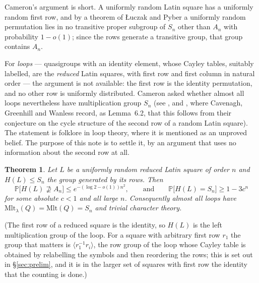\documentclass[11pt]{amsart}
\theoremstyle{plain}
\newtheorem{theorem}{Theorem}
\theoremstyle{remark}
\newcommand{\Mlt}{\mathrm{Mlt}}
\renewcommand{\Pr}{\mathbb{P}}
\begin{document}
Cameron's argument is short.  A uniformly random Latin square has a
uniformly random first row, and by a theorem of {\L}uczak and Pyber
\cite{LP93} a uniformly random permutation lies in no transitive proper
subgroup of $S_n$ other than $A_n$ with probability $1-o(1)$; since the
rows generate a transitive group, that group contains $A_n$.

For \emph{loops} --- quasigroups with an identity element, whose Cayley
tables, suitably labelled, are the \emph{reduced} Latin squares, with
first row and first column in natural order --- the argument is not
available: the first row is the identity permutation, and no other row
is uniformly distributed.  Cameron asked whether almost all loops nevertheless have
multiplication group $S_n$ (see \cite{Cam15}, and \cite[\S6]{CGW08},
where Cavenagh, Greenhill and Wanless record, as Lemma~6.2, that this
follows from their conjecture on the cycle structure of the second row
of a random Latin square).  The statement is folklore in loop theory,
where it is mentioned as an unproved belief.  The purpose of this note
is to settle it, by an argument that uses no information about the
second row at all.

\begin{theorem}\label{thm:main}
Let $L$ be a uniformly random reduced Latin square of order $n$ and
$H(L)\le S_n$ the group generated by its rows.  Then
\[
\Pr\bigl[H(L)\not\supseteq A_n\bigr]\le e^{-(\log2-o(1))n^2},
\qquad\text{and}\qquad
\Pr\bigl[H(L)=S_n\bigr]\ge1-3c^n
\]
for some absolute $c<1$ and all large $n$.  Consequently almost all loops
have $\Mlt_\lambda(Q)=\Mlt(Q)=S_n$ and trivial character theory.
\end{theorem}

\noindent(The first row of a reduced square is the identity, so $H(L)$
is the left multiplication group of the loop.  For a square with
arbitrary first row $r_1$ the group that matters is $\langle r_1^{-1}r_i\rangle$,
the row group of the loop whose Cayley table is obtained by relabelling
the symbols and then reordering the rows; this is set out in
\S\ref{sec:prelim}, and it is in the larger set of squares
with first row the identity that the counting is done.)
\end{document}
